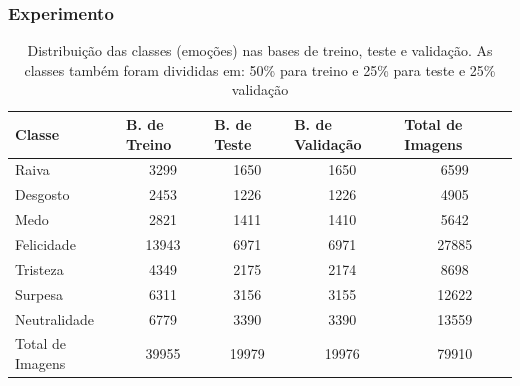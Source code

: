 \documentclass{beamer}
\begin{document}
\begin{frame}
\frametitle{Experimento}
\begin{table}[]
\tiny
\centering
\caption{Distribuição das classes (emoções) nas bases de treino, teste e validação. As classes também foram divididas em: 50\% para treino e 25\% para teste e 25\% validação}
\label{table:distclasse}
\begin{tabular}{lcccc}
\hline
\textbf{Classe}  & \multicolumn{1}{l}{\textbf{B. de Treino}} & \multicolumn{1}{l}{\textbf{B. de Teste}} & \multicolumn{1}{l}{\textbf{B. de Validação}} & \multicolumn{1}{l}{\textbf{Total de Imagens}} \\ \hline
Raiva            & 3299                                        & 1650                                       & 1650                                           & 6599                                          \\
Desgosto         & 2453                                        & 1226                                       & 1226                                           & 4905                                          \\
Medo             & 2821                                        & 1411                                       & 1410                                           & 5642                                          \\
Felicidade       & 13943                                       & 6971                                       & 6971                                           & 27885                                         \\
Tristeza         & 4349                                        & 2175                                       & 2174                                           & 8698                                          \\
Surpesa          & 6311                                        & 3156                                       & 3155                                           & 12622                                         \\
Neutralidade     & 6779                                        & 3390                                       & 3390                                           & 13559                                         \\
Total de Imagens & 39955                                       & 19979                                      & 19976                                          & 79910                                         \\ \hline
\end{tabular}
\end{table}
\end{frame}
\end{document}

